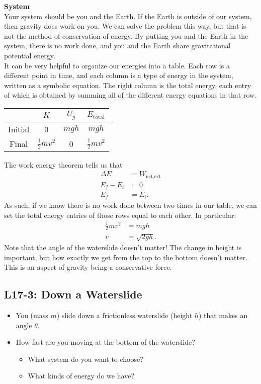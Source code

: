 \documentclass[]{article}
\newcommand{\Week}{17}
\begin{document}
\newpage
\begin{TeacherMargin}
\noindent \textbf{System} \\
Your system should be you and the Earth. If the Earth is outside of our system, then gravity does work on you. We can solve the problem this way, but that is not the method of conservation of energy. By putting you and the Earth in the system, there is no work done, and you and the Earth share gravitational potential energy. \\

\noindent It can be very helpful to organize our energies into a table. Each row is a different point in time, and each column is a type of energy in the system, written as a symbolic equation. The right column is the total energy, each entry of which is obtained by summing all of the different energy equations in that row.
\begin{center}
\Large
\begin{tabular}{|c|c|c||c|}
	\hline
	& $K$ & $U_{g}$ & $E_{\text{total}}$ \\ \hline
	Initial & 0 & $mgh$ & $mgh$ \\ \hline
	Final & $\frac{1}{2}mv^{2}$ & 0 & $\frac{1}{2}mv^{2}$ \\ \hline
\end{tabular}
\end{center}
The work energy theorem tells us that
\begin{align*}
	\Delta E & = W_{\text{net,ext}} \\
	E_{f}-E_{i} & = 0 \\
	E_{f} & = E_{i}.
\end{align*}
As such, if we know there is no work done between two times in our table, we can set the total energy entries of those rows equal to each other. In particular:
\begin{align*}
	\frac{1}{2}mv^{2} & = mgh \\
	v & = \sqrt{2gh}.
\end{align*}
Note that the angle of the waterslide doesn't matter! The change in height is important, but how exactly we get from the top to the bottom doesn't matter. This is an aspect of gravity being a conservative force.
\end{TeacherMargin}
\begin{PresentSpace}
\vspace{-10pt}
\section*{L\Week-3: Down a Waterslide}
\vspace{-10pt}
\begin{itemize}
	\item You (mass $m$) slide down a frictionless waterslide (height $h$) that makes an angle $\theta$.
	\item How fast are you moving at the bottom of the waterslide?
	\begin{itemize}
		\item What system do you want to choose?
		\item What kinds of energy do we have?
	\end{itemize}
\end{itemize}
\end{PresentSpace}
\end{document}
